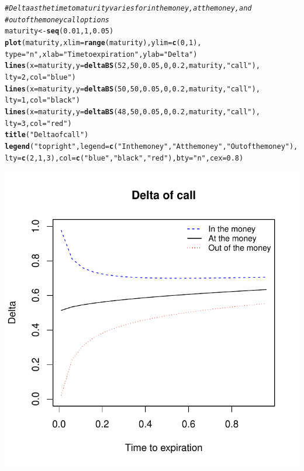 \documentclass{article}\usepackage[]{graphicx}\usepackage[]{color}
\makeatletter
\def\maxwidth{ %
  \ifdim\Gin@nat@width>\linewidth
    \linewidth
  \else
    \Gin@nat@width
  \fi
}
\newcommand{\hlstr}[1]{\textcolor[rgb]{0.192,0.494,0.8}{#1}}%
\newcommand{\hlcom}[1]{\textcolor[rgb]{0.678,0.584,0.686}{\textit{#1}}}%
\newcommand{\hlkwd}[1]{\textcolor[rgb]{0.737,0.353,0.396}{\textbf{#1}}}%
\newenvironment{kframe}{%
 \def\at@end@of@kframe{}%
 \ifinner\ifhmode%
  \def\at@end@of@kframe{\end{minipage}}%
  \begin{minipage}{\columnwidth}%
 \fi\fi%
 \def\FrameCommand##1{\hskip\@totalleftmargin \hskip-\fboxsep
 \colorbox{shadecolor}{##1}\hskip-\fboxsep
     \hskip-\linewidth \hskip-\@totalleftmargin \hskip\columnwidth}%
 \MakeFramed {\advance\hsize-\width
   \@totalleftmargin\z@ \linewidth\hsize
   \@setminipage}}%
 {\par\unskip\endMakeFramed%
 \at@end@of@kframe}
\newenvironment{knitrout}{}{} %
\makeatother
\begin{document}
\begin{knitrout}
\color{fgcolor}\begin{kframe}
\begin{alltt}
\hlcom{# Delta as the time to maturity varies for in the money, at the money, and}
\hlcom{# out of the money call options}
maturity <- \hlkwd{seq}(0.01, 1, 0.05)
\hlkwd{plot}(maturity, xlim = \hlkwd{range}(maturity), ylim = \hlkwd{c}(0,1), 
     type=\hlstr{"n"}, xlab=\hlstr{"Time to expiration"}, ylab=\hlstr{"Delta"})
\hlkwd{lines}(x = maturity, y = \hlkwd{deltaBS}(52, 50, 0.05, 0, 0.2, maturity, \hlstr{"call"}), 
      lty=2, col=\hlstr{"blue"})
\hlkwd{lines}(x = maturity, y = \hlkwd{deltaBS}(50, 50, 0.05, 0, 0.2, maturity, \hlstr{"call"}), 
      lty=1, col=\hlstr{"black"})
\hlkwd{lines}(x = maturity, y = \hlkwd{deltaBS}(48, 50, 0.05, 0, 0.2, maturity, \hlstr{"call"}), 
      lty=3, col=\hlstr{"red"})
\hlkwd{title}(\hlstr{"Delta of call"})
\hlkwd{legend}(\hlstr{"topright"}, legend=\hlkwd{c}(\hlstr{"In the money"}, \hlstr{"At the money"}, \hlstr{"Out of the money"}),
       lty=\hlkwd{c}(2,1,3), col=\hlkwd{c}(\hlstr{"blue"}, \hlstr{"black"}, \hlstr{"red"}), bty=\hlstr{"n"}, cex=0.8)
\end{alltt}
\end{kframe}
\includegraphics[width=\maxwidth]{figure/unnamed-chunk-10} 

\end{knitrout}
\end{document}
